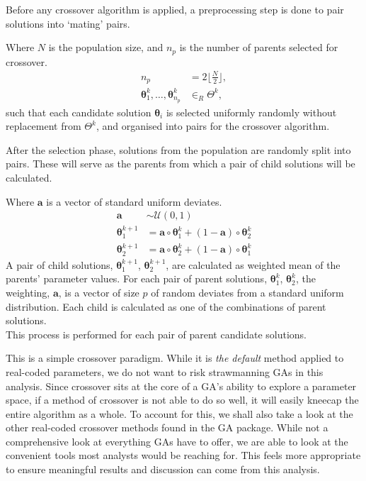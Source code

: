 \documentclass[
  a4paper,
  DIV=11,
  numbers=noendperiod]{scrartcl}
\newcommand{\B}[1]{\boldsymbol{#1}}
\newcommand{\+}{\phantom{-}}
\begin{document}
Before any crossover algorithm is applied, a preprocessing step is done
to pair solutions into `mating' pairs.

Where \(N\) is the population size, and \(n_p\) is the number of parents
selected for crossover. \[
\begin{aligned}
n_p &= 2\lfloor \frac{N}2\rfloor ,
\\
\B\theta^k_1, \dots, \B\theta^k_{n_p}  &\in_R \Theta^k,
\end{aligned}
\] such that each candidate solution \(\B\theta_i\) is selected
uniformly randomly without replacement from \(\Theta^k\), and organised
into pairs for the crossover algorithm.

After the selection phase, solutions from the population are randomly
split into pairs. These will serve as the parents from which a pair of
child solutions will be calculated.

\begin{tcolorbox}[title=Local arithmetic crossover: \texttt{gareal\_laCrossover()}]
Where $\B a$ is a vector of standard uniform deviates.
$$
\begin{aligned}
\B a &\sim \mathcal U\!\left(0,1\right)\\
\B\theta_1^{k+1} &= \B a \circ \B\theta_1^k +\left(1-\B a\right)\circ\B\theta_2^k \\
\B\theta_2^{k+1} &= \B a \circ \B\theta_2^k +\left(1-\B a\right)\circ\B\theta_1^k
\end{aligned}
$$
A pair of child solutions, $\B\theta_1^{k+1}$, $\B\theta_2^{k+1}$, are calculated as weighted mean of the parents' parameter values. For each pair of parent solutions, $\B\theta^k_1$, $\B\theta^k_2$, the weighting, $\B a$, is a vector of size $p$ of random deviates from a standard uniform distribution. Each child is calculated as one of the combinations of parent solutions.\\

This process is performed for each pair of parent candidate solutions.
\end{tcolorbox}

This is a simple crossover paradigm. While it is \emph{the default}
method applied to real-coded parameters, we do not want to risk
strawmanning GAs in this analysis. Since crossover sits at the core of a
GA's ability to explore a parameter space, if a method of crossover is
not able to do so well, it will easily kneecap the entire algorithm as a
whole. To account for this, we shall also take a look at the other
real-coded crossover methods found in the GA package. While not a
comprehensive look at everything GAs have to offer, we are able to look
at the convenient tools most analysts would be reaching for. This feels
more appropriate to ensure meaningful results and discussion can come
from this analysis.
\end{document}
